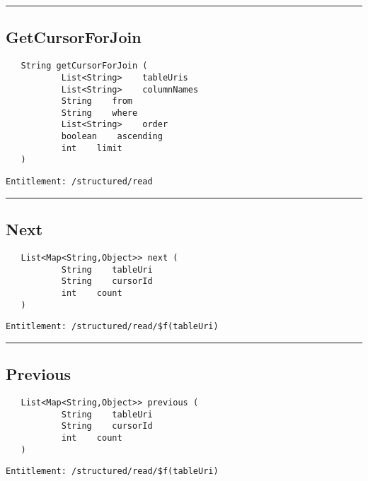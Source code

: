 \rule{12cm}{2pt}
\subsection{GetCursorForJoin}
\label{Api:GetCursorForJoin}
\begin{verbatim}
   String getCursorForJoin (
           List<String>    tableUris
           List<String>    columnNames
           String    from
           String    where
           List<String>    order
           boolean    ascending
           int    limit
   )
\end{verbatim}
\begin{Verbatim}[fontsize=\small, formatcom=\color{Maroon}]
  Entitlement: /structured/read
\end{Verbatim}



\rule{12cm}{2pt}
\subsection{Next}
\label{Api:Next}
\begin{verbatim}
   List<Map<String,Object>> next (
           String    tableUri
           String    cursorId
           int    count
   )
\end{verbatim}
\begin{Verbatim}[fontsize=\small, formatcom=\color{Maroon}]
  Entitlement: /structured/read/$f(tableUri)
\end{Verbatim}



\rule{12cm}{2pt}
\subsection{Previous}
\label{Api:Previous}
\begin{verbatim}
   List<Map<String,Object>> previous (
           String    tableUri
           String    cursorId
           int    count
   )
\end{verbatim}
\begin{Verbatim}[fontsize=\small, formatcom=\color{Maroon}]
  Entitlement: /structured/read/$f(tableUri)
\end{Verbatim}



